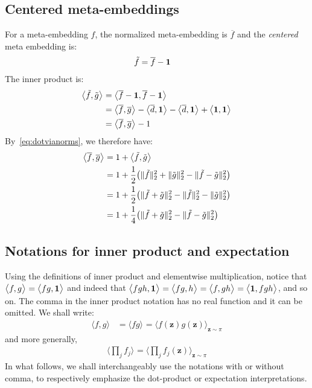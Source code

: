 \documentclass[a4paper,oneside,12pt,english]{report}
\def\zvec{\mathbf{z}}
\def\expv#1#2{\bigl\langle#1\bigr\rangle_{#2}}
\def\dot#1#2{\expv{#1,#2}{}}
\def\normal#1{\overline{#1}}
\def\dotn#1#2{\dot{\normal{#1}}{\normal{#2}}}
\begin{document}
\subsection{Centered meta-embeddings}
For a meta-embedding $f$, the normalized meta-embedding is $\normal{f}$ and the \emph{centered} meta embedding is:
\begin{align}
\tilde{f} &= \normal{f}-\onevec
\end{align}	
The inner product is:
\begin{align}
\begin{split}
\dot{\tilde{f}}{\tilde{g}} &= \dot{\normal{f}-\onevec}{\normal{f}-\onevec} \\
&= \dotn{f}{g} -\dot{\normal{d}}{\onevec} -\dot{\normal{d}}{\onevec} + \dot{\onevec}{\onevec} \\
&= \dotn{f}{g} -1
\end{split}
\end{align}
By~\eqref{eq:dotvianorms}, we therefore have:
\begin{align}
\begin{split}
\dotn{f}{g} &= 1+ \dot{\tilde{f}}{\tilde{g}} \\
&= 1+ \frac12\bigl(\norm{\tilde{f}}^2+\norm{\tilde{g}}^2 - \norm{\tilde{f}-\tilde{g}}^2\bigr) \\
&= 1+ \frac12\bigl(\norm{\tilde{f}+\tilde{g}}^2 - \norm{\tilde{f}}^2- \norm{\tilde{g}}^2\bigr)  \\
&= 1+ \frac14\bigl(\norm{\tilde{f}+\tilde{g}}^2-\norm{\tilde{f}-\tilde{g}}^2\bigr)
\end{split}
\end{align}	
\subsection{Notations for inner product and expectation}
Using the definitions of inner product and elementwise multiplication, notice that $\dot{f}{g}=\dot{fg}{\onevec}$ and indeed that $\dot{fgh}{\onevec}=\dot{fg}{h}=\dot{f}{gh}=\dot{\onevec}{fgh}$, and so on. The comma in the inner product notation has no real function and it can be omitted. We shall write:
\begin{align}
\dot{f}{g} &= \expv{fg}{} = \expv{f(\zvec)g(\zvec)}{\zvec\sim\pi}
\end{align} 
and more generally,
\begin{align}
\expv{\prod_j f_j}{} = \expv{\prod_j f_j(\zvec)}{\zvec\sim\pi}
\end{align} 
In what follows, we shall interchangeably use the notations with or without comma, to respectively emphasize the dot-product or expectation interpretations.
\end{document}
